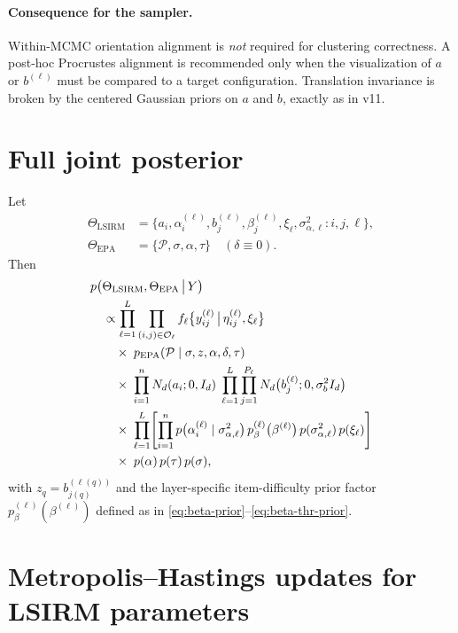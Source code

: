 \documentclass[11pt]{article}
\DeclareMathOperator{\EPA}{EPA}
\begin{document}
\paragraph{Consequence for the sampler.}
Within-MCMC orientation alignment is \emph{not} required for clustering
correctness.  A post-hoc Procrustes alignment is recommended only when the
visualization of $a$ or $b^{(\ell)}$ must be compared to a target
configuration.  Translation invariance is broken by the centered Gaussian
priors on $a$ and $b$, exactly as in v11.

\section{Full joint posterior}

Let
\begin{align*}
    \Theta_{\mathrm{LSIRM}}
    &=\{a_i,\alpha_i^{(\ell)},b_j^{(\ell)},\beta_j^{(\ell)},\xi_\ell,\sigma_{\alpha,\ell}^2:i,j,\ell\},\\
    \Theta_{\mathrm{EPA}}
    &=\{\mathcal{P},\sigma,\alpha,\tau\}\quad(\delta\equiv 0).
\end{align*}
Then
\begin{align}
&p\bigl(\Theta_{\mathrm{LSIRM}},\Theta_{\mathrm{EPA}}\,\big|\,Y\bigr)
\notag\\
&\quad\propto
\prod_{\ell=1}^L
\prod_{(i,j)\in\mathcal{O}_\ell}
    f_\ell\bigl\{y_{ij}^{(\ell)}\,\big|\,\eta_{ij}^{(\ell)},\xi_\ell\bigr\}
\notag\\
&\qquad\times\;
p_{\EPA}(\mathcal{P}\mid\sigma,z,\alpha,\delta,\tau)
\notag\\
&\qquad\times\;
\prod_{i=1}^n N_d(a_i;0,I_d)\;
\prod_{\ell=1}^L\prod_{j=1}^{P_\ell} N_d\bigl(b_j^{(\ell)};0,\sigma_b^2 I_d\bigr)
\notag\\
&\qquad\times\;
\prod_{\ell=1}^L\!\left[
\prod_{i=1}^n p\bigl(\alpha_i^{(\ell)}\mid\sigma_{\alpha,\ell}^2\bigr)\,
p_\beta^{(\ell)}\bigl(\beta^{(\ell)}\bigr)\,
p(\sigma_{\alpha,\ell}^2)\,p(\xi_\ell)
\right]
\notag\\
&\qquad\times\;
p(\alpha)\,p(\tau)\,p(\sigma),
\label{eq:full-posterior}
\end{align}
with $z_q=b_{j(q)}^{(\ell(q))}$ and the layer-specific item-difficulty prior
factor $p_\beta^{(\ell)}(\beta^{(\ell)})$ defined as in
\eqref{eq:beta-prior}--\eqref{eq:beta-thr-prior}.

\section{Metropolis--Hastings updates for LSIRM parameters}
\end{document}
